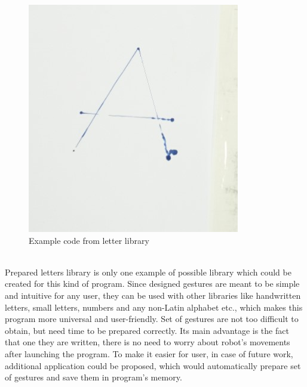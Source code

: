 \begin{figure}[H]
	\includegraphics{letter}
	\centering
	\caption{Example code from letter library}
	\label{fig:letter}
\end{figure}

\mbox{}\\
Prepared letters library is only one example of possible library which could be created for this kind of program. Since designed gestures are meant to be simple and intuitive for any user, they can be used with other libraries like handwritten letters, small letters, numbers and any non-Latin alphabet etc., which makes this program more universal and user-friendly. Set of gestures are not too difficult to obtain, but need time to be prepared correctly. Its main advantage is the fact that one they are written, there is no need to worry about robot’s movements after launching the program. To make it easier for user, in case of future work, additional application could be proposed, which would automatically prepare set of gestures and save them in program’s memory.
